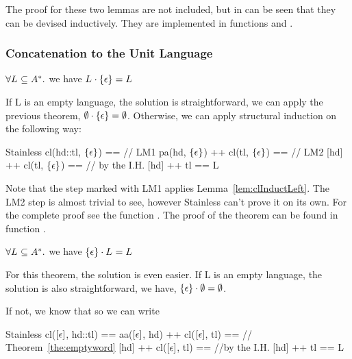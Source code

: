 The proof for these two lemmas are not included, but in can be seen that they can be devised inductively. They are implemented in functions  and .

\subsubsection{Concatenation to the Unit Language}

\begin{theorem}
	\label{the:rightUnitConcat}
	$\forall L_{} \subseteq A^{*}.$ we have  $L_{} \cdot \{\epsilon\} = L_{}$
\end{theorem}

If L is an empty language, the solution is straightforward, we can apply the previous theorem, $\emptyset \cdot \{\epsilon\} = \emptyset$. Otherwise, we can apply structural induction on  the following way:

\begin{ShortCode}{Stainless}
 cl(hd::tl, $\{\epsilon\}$)              == // LM1
 pa(hd, $\{\epsilon\}$) ++ cl(tl, $\{\epsilon\}$)      == // LM2
 [hd] ++ cl(tl, $\{\epsilon\}$)          == // by the I.H.
 [hd] ++ tl                ==
 L 
\end{ShortCode}

Note that the step marked with LM1 applies Lemma~\ref{lem:clInductLeft}. The LM2 step is almost trivial to see, however Stainless can't prove it on its own. For the complete proof see the function . The proof of the theorem can be found in function .

\begin{theorem}
	\label{the:leftUnitConcat}
	$\forall L_{} \subseteq A^{*}.$ we have $\{\epsilon\} \cdot L_{} = L_{}$
\end{theorem}


For this theorem, the solution is even easier. If L is an empty language, the solution is also straightforward, we have, $\{\epsilon\} \cdot \emptyset = \emptyset$.

If not, we know that  so we can write 

\begin{ShortCode}{Stainless}
 cl($[\epsilon]$, hd::tl) == 
 aa($[\epsilon]$, hd) ++ cl($[\epsilon]$, tl) == // Theorem~\ref{the:emptyword}
 [hd] ++ cl($[\epsilon]$, tl) == //by the I.H.
 [hd] ++ tl ==
 L
\end{ShortCode}


